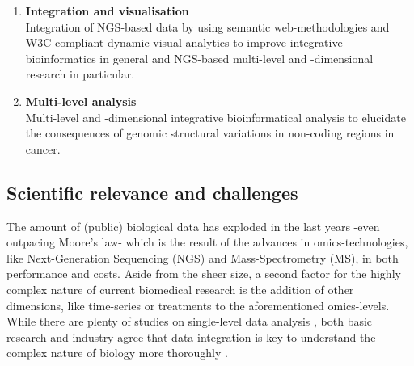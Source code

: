 \documentclass[twoside,fontsize=10pt]{article}
\begin{document}
\begin{enumerate}
\item \textbf{Integration and visualisation} \\
Integration of NGS-based data by using semantic web-methodologies and W3C-compliant dynamic visual analytics to improve integrative bioinformatics in general and NGS-based multi-level and -dimensional research in particular.
\item \textbf{Multi-level analysis} \\
Multi-level and -dimensional integrative bioinformatical analysis to elucidate the consequences of genomic structural variations in non-coding regions in cancer.
\end{enumerate}
\subsection*{Scientific relevance and challenges} %
The amount of (public) biological data has exploded in the last years -even outpacing Moore's law- which is the result of the advances in omics-technologies, like Next-Generation Sequencing (NGS) and Mass-Spectrometry (MS), in both performance and costs. Aside from the sheer size, a second factor for the highly complex nature of current biomedical research is the addition of other dimensions, like time-series or treatments to the aforementioned omics-levels. While there are plenty of studies on single-level data analysis \citep{Huttenhower2010}, both basic research and industry agree that data-integration is key to understand the complex nature of biology more thoroughly \citep{Gomez-Cabrero2014, Searls2005}.




\end{document}
